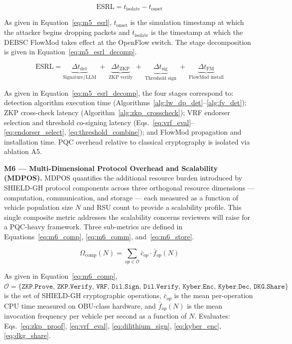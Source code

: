 \documentclass[12pt, a4paper]{report}
\newcommand{\mypar}{\vspace{0.8em}\noindent}
\begin{document}
\begin{equation}
\label{eq:m5_esrl}
\text{ESRL} = t_{\text{isolate}} - t_{\text{onset}}
\end{equation}

As given in Equation~\eqref{eq:m5_esrl}, $t_{\text{onset}}$ is the
simulation timestamp at which the attacker begins dropping packets and
$t_{\text{isolate}}$ is the timestamp at which the DEBSC FlowMod takes
effect at the OpenFlow switch. The stage decomposition is given in
Equation~\eqref{eq:m5_esrl_decomp}.

\begin{equation}
\label{eq:m5_esrl_decomp}
\text{ESRL} =
\underbrace{\Delta t_{\text{det}}}_{\text{Signature/LLM}}
\;+\;
\underbrace{\Delta t_{\text{ZKP}}}_{\text{ZKP verify}}
\;+\;
\underbrace{\Delta t_{\text{sig}}}_{\text{Threshold sign}}
\;+\;
\underbrace{\Delta t_{\text{FM}}}_{\text{FlowMod install}}
\end{equation}

As given in Equation~\eqref{eq:m5_esrl_decomp}, the four stages correspond
to: detection algorithm execution time
(Algorithms~\ref{alg:lw_dp_det}--\ref{alg:fv_det}); ZKP cross-check
latency (Algorithm~\ref{alg:zkp_crosscheck}); VRF endorser selection and
threshold co-signing latency
(Eqs.~\eqref{eq:vrf_eval}--\eqref{eq:endorser_select},
\eqref{eq:threshold_combine}); and FlowMod propagation and installation
time. PQC overhead relative to classical cryptography is isolated via
ablation A5.

\mypar
\textbf{M6 --- Multi-Dimensional Protocol Overhead and Scalability (MDPOS).}
MDPOS quantifies the additional resource burden introduced by SHIELD-GH
protocol components across three orthogonal resource dimensions — computation,
communication, and storage — each measured as a function of vehicle population
size $N$ and RSU count to provide a scalability profile. This single
composite metric addresses the scalability concerns reviewers will raise for
a PQC-heavy framework. Three sub-metrics are defined in
Equations~\eqref{eq:m6_comp}, \eqref{eq:m6_comm},
and~\eqref{eq:m6_store}.

\begin{equation}
\label{eq:m6_comp}
\Omega_{\text{comp}}(N) =
\sum_{op \in \mathcal{O}}
\bar{c}_{op} \cdot \bar{f}_{op}(N)
\end{equation}

As given in Equation~\eqref{eq:m6_comp},
$\mathcal{O} = \{\texttt{ZKP.Prove},\, \texttt{ZKP.Verify},\,
\texttt{VRF},\, \texttt{Dil.Sign},\, \texttt{Dil.Verify},\,
\texttt{Kyber.Enc},\, \texttt{Kyber.Dec},\, \texttt{DKG.Share}\}$
is the set of SHIELD-GH cryptographic operations, $\bar{c}_{op}$ is the
mean per-operation CPU time measured on OBU-class hardware, and
$\bar{f}_{op}(N)$ is the mean invocation frequency per vehicle per second
as a function of $N$. Evaluates: Eqs.~\eqref{eq:zkp_proof},
\eqref{eq:vrf_eval}, \eqref{eq:dilithium_sign}, \eqref{eq:kyber_enc},
\eqref{eq:dkg_share}.
\end{document}
